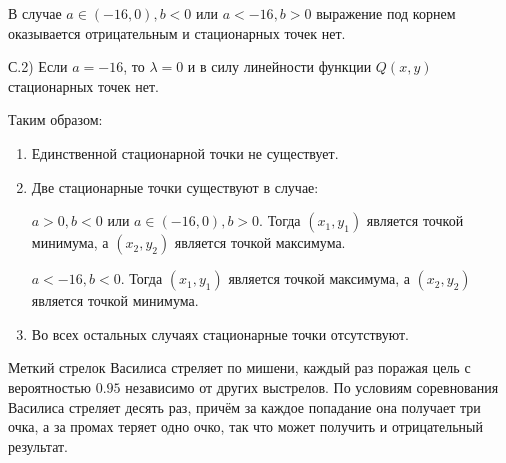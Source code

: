 \documentclass[addpoints, answers]{exam} %
\begin{document}
\begin{questions}
\begin{solution}
В случае $a\in \left(-16,0\right),b<0$ или $a<-16,b>0$ выражение под корнем оказывается отрицательным и стационарных точек нет.

С.2) Если $a=-16$, то $\lambda =0$ и в силу линейности функции $Q(x,y)$ стационарных точек нет.



Таким образом:

\begin{enumerate}
\item  Единственной стационарной точки не существует.

\item  Две стационарные точки существуют в случае:


$a>0,b<0$ или $a\in \left(-16,0\right),b>0$. Тогда $\left(x_{1} ,y_{1} \right)$ является точкой минимума, а $\left(x_{2} ,y_{2} \right)$ является точкой максимума.

$a<-16,b<0$. Тогда $\left(x_{1} ,y_{1} \right)$ является точкой максимума, а $\left(x_{2} ,y_{2} \right)$ является точкой минимума.

\item Во всех остальных случаях стационарные точки отсутствуют.
\end{enumerate}
\end{solution}


\question  Меткий стрелок Василиса стреляет по мишени, каждый раз поражая цель с вероятностью $0.95$ независимо от других выстрелов. По условиям соревнования Василиса стреляет десять раз, причём за каждое попадание она получает три очка, а за промах теряет одно очко, так что может получить и отрицательный результат.
\end{questions}
\end{document}

